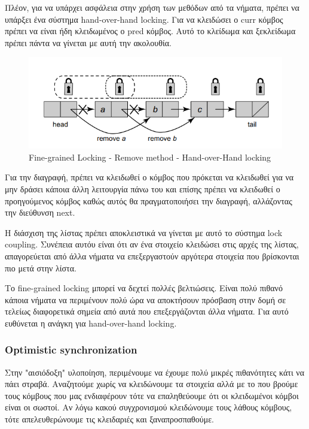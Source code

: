 \documentclass[../final_report.tex]{subfiles}
\begin{document}
Πλέον, για να υπάρχει ασφάλεια στην χρήση των μεθόδων από τα νήματα, πρέπει να υπάρξει ένα σύστημα hand-over-hand locking. 
Για να κλειδώσει ο curr κόμβος πρέπει να είναι ήδη κλειδωμένος ο pred κόμβος. Αυτό το κλείδωμα και ξεκλείδωμα πρέπει πάντα να γίνεται
με αυτή την ακολουθία.
\begin{figure}[H]
    \centering
        \includegraphics[scale=0.7]{fglRemove.png}
    \caption{Fine-grained Locking - Remove method - Hand-over-Hand locking}
    \label{fig:Fine-grained Locking - Remove method - Hand-over-Hand locking}
\end{figure}

Για την διαγραφή, πρέπει να κλειδωθεί ο κόμβος που πρόκεται να κλειδωθεί για να μην δράσει κάποια άλλη λειτουργία πάνω του και επίσης
πρέπει να κλειδωθεί ο προηγούμενος κόμβος καθώς αυτός θα πραγματοποιήσει την διαγραφή, αλλάζοντας την διεύθυνση next.

Η διάσχιση της λίστας πρέπει αποκλειστικά να γίνεται με αυτό το σύστημα lock coupling. Συνέπεια αυτόυ είναι ότι αν ένα στοιχείο κλειδώσει
στις αρχές της λίστας, απαγορεύεται από άλλα νήματα να επεξεργαστούν αργότερα στοιχεία που βρίσκονται πιο μετά στην λίστα.

Το fine-grained locking μπορεί να δεχτεί πολλές βελτιώσεις. Είναι πολύ πιθανό κάποια νήματα να περιμένουν πολύ
ώρα να αποκτήσουν πρόσβαση στην δομή σε τελείως διαφορετικά σημεία από αυτά που επεξεργάζονται άλλα νήματα.
Για αυτό ευθύνεται η ανάγκη για hand-over-hand locking.

\subsubsection{Optimistic synchronization}
Στην "αισιόδοξη" υλοποίηση, περιμένουμε να έχουμε πολύ μικρές πιθανότητες κάτι να πάει στραβά. Αναζητούμε χωρίς να 
κλειδώνουμε τα στοιχεία αλλά με το που βρούμε τους κόμβους που μας ενδιαφέρουν τότε να επαληθεύουμε ότι οι κλειδωμένοι
κόμβοι είναι οι σωστοί. Αν λόγω κακού συγχρονισμού κλειδώνουμε τους λάθους κόμβους, τότε απελευθερώνουμε τις κλειδαριές και
ξαναπροσπαθούμε.
\end{document}
